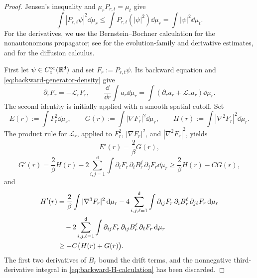\documentclass[11pt,reqno]{amsart}
\numberwithin{equation}{section}
\theoremstyle{plain}
\theoremstyle{remark}
\renewcommand{\d}{\mathsf{d}}\newcommand{\s}{\mathsf{s}}
\begin{document}
\begin{proof}
Jensen's inequality and $\mu_rP_{r,t}=\mu_t$ give
\begin{equation}\label{eq:backward-contraction-calculation}
 \int|P_{r,t}\psi|^2\dd\mu_r
 \le\int P_{r,t}(|\psi|^2)\dd\mu_r
 =\int|\psi|^2\dd\mu_t.
\end{equation}
For the derivatives, we use the Bernstein--Bochner calculation for the nonautonomous propagator; see \cite{KLL,AngiuliLorenzi,Lunardi} for the evolution-family and derivative estimates, and \cite{BGL} for the diffusion calculus.

First let $\psi\in C_c^\infty(\R^\d)$ and set $F_r:=P_{r,t}\psi$. Its backward equation and \eqref{eq:backward-generator-density} give
\begin{equation}\label{eq:backward-differentiation-rule}
 \partial_rF_r=-\mathcal L_rF_r,\qquad
 \frac{\dd}{\dd r}\int a_r\dd\mu_r
 =\int(\partial_ra_r+\mathcal L_ra_r)\dd\mu_r.
\end{equation}
The second identity is initially applied with a smooth spatial cutoff. Set
\begin{equation}\label{eq:backward-energy-definitions}
 E(r):=\int F_r^2\dd\mu_r,\qquad
 G(r):=\int|\nabla F_r|^2\dd\mu_r,\qquad
 H(r):=\int|\nabla^2F_r|^2\dd\mu_r.
\end{equation}
The product rule for $\mathcal L_r$, applied to $F_r^2$, $|\nabla F_r|^2$, and $|\nabla^2F_r|^2$, yields
\begin{equation}\label{eq:backward-EG}
 E'(r)=\frac2\beta G(r),
\end{equation}
\begin{equation}
 G'(r) =\frac2\beta H(r) -2\sum_{i,j=1}^{\d}\int\partial_iF_r\,\partial_iB_r^j\,\partial_jF_r\dd\mu_r \ge\frac2\beta H(r)-CG(r), \label{eq:backward-G-calculation}
\end{equation}
and
\begin{align}
 H'(r)
 &=\frac2\beta\int|\nabla^3F_r|^2\dd\mu_r
  -4\sum_{i,j,\ell=1}^{\d}\int
       \partial_{ij}F_r\,\partial_iB_r^\ell\,\partial_{j\ell}F_r\dd\mu_r\notag\\
 &\quad-2\sum_{i,j,\ell=1}^{\d}\int
       \partial_{ij}F_r\,\partial_{ij}B_r^\ell\,\partial_\ell F_r\dd\mu_r\notag\\
 &\ge-C\bigl(H(r)+G(r)\bigr).
 \label{eq:backward-H-calculation}
\end{align}
The first two derivatives of $B_r$ bound the drift terms, and the nonnegative third-derivative integral in \eqref{eq:backward-H-calculation} has been discarded.


\end{proof}
\end{document}
